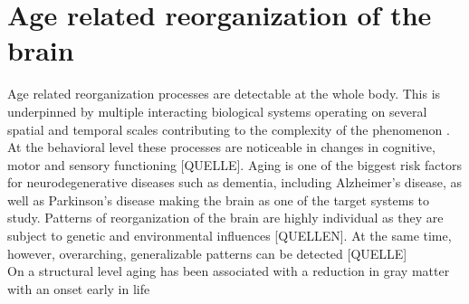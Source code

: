	\section{Age related reorganization of the brain}
	Age related reorganization processes are detectable at the whole body. This is underpinned by multiple interacting biological systems operating on several spatial and temporal scales contributing to the complexity of the phenomenon \cite{Mooney2016}. At the behavioral level these processes are noticeable in changes in cognitive, motor and sensory functioning [QUELLE]. Aging is one of the biggest risk factors for neurodegenerative diseases such as dementia, including Alzheimer's disease, as well as Parkinson's disease making the brain as one of the target systems to study. Patterns of reorganization of the brain are highly individual as they are subject to genetic and environmental influences [QUELLEN]. At the same time, however, overarching, generalizable patterns can be detected [QUELLE]\\
	On a structural level aging has been associated with a reduction in gray matter with an onset early in life 





